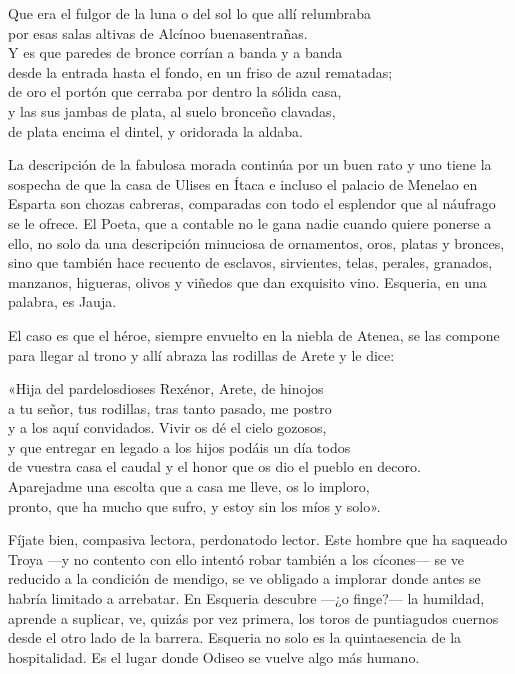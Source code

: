 \begin{versocita}
Que era el fulgor de la luna o del sol lo que allí relumbraba\\
por esas salas altivas de Alcínoo buenasentrañas.\\
Y es que paredes de bronce corrían a banda y a banda\\
desde la entrada hasta el fondo, en un friso de azul rematadas;\\
de oro el portón que cerraba por dentro la sólida casa,\\
y las sus jambas de plata, al suelo bronceño clavadas,\\
de plata encima el dintel, y oridorada la aldaba.
\end{versocita}

La descripción de la fabulosa morada continúa por un buen rato y uno tiene la sospecha de que la casa de Ulises en Ítaca e incluso el palacio de Menelao en Esparta son chozas cabreras, comparadas con todo el esplendor que al náufrago se le ofrece. El Poeta, que a contable no le gana nadie cuando quiere ponerse a ello, no solo da una descripción minuciosa de ornamentos, oros, platas y bronces, sino que también hace recuento de esclavos, sirvientes, telas, perales, granados, manzanos, higueras, olivos y viñedos que dan exquisito vino. Esqueria, en una palabra, es Jauja.

El caso es que el héroe, siempre envuelto en la niebla de Atenea, se las compone para llegar al trono y allí abraza las rodillas de Arete y le dice:

\begin{versocita}
«Hija del pardelosdioses Rexénor, Arete, de hinojos\\
a tu señor, tus rodillas, tras tanto pasado, me postro\\
y a los aquí convidados. Vivir os dé el cielo gozosos,\\
y que entregar en legado a los hijos podáis un día todos\\
de vuestra casa el caudal y el honor que os dio el pueblo en decoro.\\
Aparejadme una escolta que a casa me lleve, os lo imploro,\\
pronto, que ha mucho que sufro, y estoy sin los míos y solo».
\end{versocita}

Fíjate bien, compasiva lectora, perdonatodo lector. Este hombre que ha saqueado Troya ---y no contento con ello intentó robar también a los cícones--- se ve reducido a la condición de mendigo, se ve obligado a implorar donde antes se habría limitado a arrebatar. En Esqueria descubre ---¿o finge?--- la humildad, aprende a suplicar, ve, quizás por vez primera, los toros de puntiagudos cuernos desde el otro lado de la barrera. Esqueria no solo es la quintaesencia de la hospitalidad. Es el lugar donde Odiseo se vuelve algo más humano.

